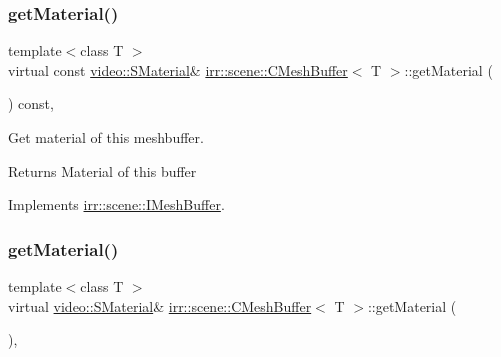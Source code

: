 \subsubsection{\texorpdfstring{get\+Material()}{getMaterial()}\hspace{0.1cm}{\footnotesize\ttfamily [2/4]}}
{\footnotesize\ttfamily template$<$class T $>$ \\
virtual const \hyperlink{classirr_1_1video_1_1SMaterial}{video\+::\+S\+Material}\& \hyperlink{classirr_1_1scene_1_1CMeshBuffer}{irr\+::scene\+::\+C\+Mesh\+Buffer}$<$ T $>$\+::get\+Material (\begin{DoxyParamCaption}{ }\end{DoxyParamCaption}) const\hspace{0.3cm}{\ttfamily [inline]}, {\ttfamily [virtual]}}



Get material of this meshbuffer. 

\begin{DoxyReturn}{Returns}
Material of this buffer 
\end{DoxyReturn}


Implements \hyperlink{classirr_1_1scene_1_1IMeshBuffer_a341c1da2fd0cd556a15aab06d07dbbaa}{irr\+::scene\+::\+I\+Mesh\+Buffer}.

\mbox{\label{classirr_1_1scene_1_1CMeshBuffer_af69e8356b4525a3fee1ddbf188d81e8a}} 
\subsubsection{\texorpdfstring{get\+Material()}{getMaterial()}\hspace{0.1cm}{\footnotesize\ttfamily [3/4]}}
{\footnotesize\ttfamily template$<$class T $>$ \\
virtual \hyperlink{classirr_1_1video_1_1SMaterial}{video\+::\+S\+Material}\& \hyperlink{classirr_1_1scene_1_1CMeshBuffer}{irr\+::scene\+::\+C\+Mesh\+Buffer}$<$ T $>$\+::get\+Material (\begin{DoxyParamCaption}{ }\end{DoxyParamCaption})\hspace{0.3cm}{\ttfamily [inline]}, {\ttfamily [virtual]}}



